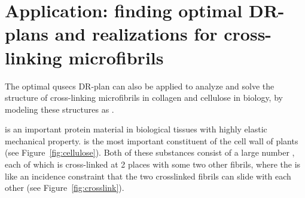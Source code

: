 \section{Application: finding optimal DR-plans and realizations for cross-linking microfibrils }
\label{sec:pinnedline}

The optimal qusecs DR-plan can also be applied to analyze and solve
the structure of  cross-linking microfibrils in collagen and cellulose
in biology, by modeling these structures as .

 is an important protein material in biological tissues with highly elastic mechanical property.
 is the most important constituent of the cell wall of plants (see Figure~\ref{fig:cellulose}).
Both of these substances consist of a large number ,
each of which is cross-linked at 2 places with some two other fibrils,
where the  is like an incidence constraint that the
two crosslinked fibrils can slide with each other  \uncited (see
Figure~\ref{fig:crosslink}).

%
%
%
%
%
%


